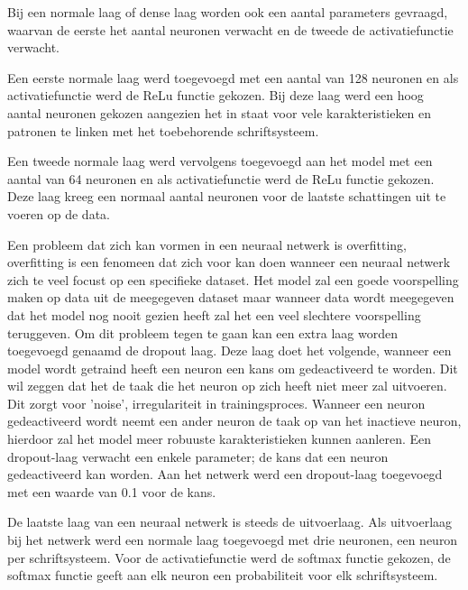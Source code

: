 Bij een normale laag of dense laag worden ook een aantal parameters gevraagd, waarvan de eerste het aantal neuronen verwacht en de tweede de activatiefunctie verwacht.

Een eerste normale laag werd toegevoegd met een aantal van 128 neuronen en als activatiefunctie werd de ReLu functie gekozen.
Bij deze laag werd een hoog aantal neuronen gekozen aangezien het in staat voor vele karakteristieken en patronen te linken met het toebehorende schriftsysteem.

Een tweede normale laag werd vervolgens toegevoegd aan het model met een aantal van 64 neuronen en als activatiefunctie werd de ReLu functie gekozen.
Deze laag kreeg een normaal aantal neuronen voor de laatste schattingen uit te voeren op de data.

Een probleem dat zich kan vormen in een neuraal netwerk is overfitting,
overfitting is een fenomeen dat zich voor kan doen wanneer een neuraal netwerk zich te veel focust op een specifieke dataset.
Het model zal een goede voorspelling maken op data uit de meegegeven dataset maar wanneer data wordt meegegeven dat het model nog nooit gezien heeft zal het een veel slechtere voorspelling teruggeven.
Om dit probleem tegen te gaan kan een extra laag worden toegevoegd genaamd de dropout laag.
Deze laag doet het volgende, wanneer een model wordt getraind heeft een neuron een kans om gedeactiveerd te worden.
Dit wil zeggen dat het de taak die het neuron op zich heeft niet meer zal uitvoeren.
Dit zorgt voor 'noise', irregulariteit in trainingsproces.
Wanneer een neuron gedeactiveerd wordt neemt een ander neuron de taak op van het inactieve neuron, hierdoor zal het model meer robuuste karakteristieken kunnen aanleren.
Een dropout-laag verwacht een enkele parameter; de kans dat een neuron gedeactiveerd kan worden.
Aan het netwerk werd een dropout-laag toegevoegd met een waarde van 0.1 voor de kans.

De laatste laag van een neuraal netwerk is steeds de uitvoerlaag.
Als uitvoerlaag bij het netwerk werd een normale laag toegevoegd met drie neuronen, een neuron per schriftsysteem.
Voor de activatiefunctie werd de softmax functie gekozen, de softmax functie geeft aan elk neuron een probabiliteit voor elk schriftsysteem.

